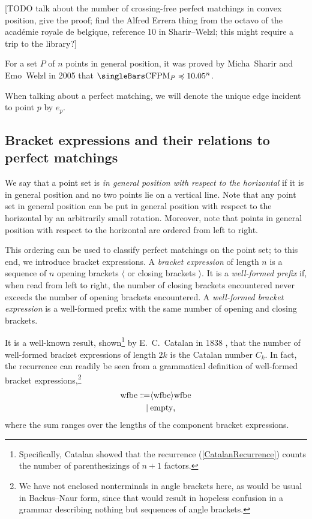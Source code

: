 \documentclass[10pt, a4paper, twoside]{basestyle}
\DeclareMathOperator{\CFPM}{CFPM}
\begin{document}
[TODO talk about the number of crossing-free perfect matchings in convex position, give the proof;
find the Alfred Errera thing from the octavo of the académie royale de belgique, reference 10 in
Sharir--Welzl; this might require a trip to the library?]

For a set $P$ of $n$ points in general position, it was proved by Micha~Sharir and Emo~Welzl in 2005
\cite{SharirWelzl2006} that $\Cardinality{\CFPM_P} \preccurlyeq 10.05^n$.

When talking about a perfect matching, we will denote the unique edge incident to point $p$ by
$e_p$.

\subsection{Bracket expressions and their relations to perfect matchings}

We say that a point set is \emph{in general position with respect to the horizontal} if it
is in general position and no two points lie on a vertical line. Note that any point set in
general position can be put in general position with respect to the horizontal by an arbitrarily
small rotation. Moreover, note that points in general position with respect to the horizontal
are ordered from left to right.

This ordering can be used to classify perfect matchings on the point set; to this end,
we introduce bracket expressions.
A \emph{bracket expression} of length $n$ is a sequence of $n$ opening brackets $\langle$ or closing
brackets $\rangle$.
It is a \emph{well-formed prefix} if, when read from left to right, the number of closing brackets
encountered never exceeds the number of opening brackets encountered.
A \emph{well-formed bracket expression} is a well-formed prefix with the same number of opening and
closing brackets.

It is a well-known result, shown\footnote{Specifically, Catalan showed that the recurrence (\ref{CatalanRecurrence})
counts the number of parenthesizings of $n+1$ factors.} by E.~C.~Catalan in 1838 \cite{Catalan1838}, that the
number of well-formed bracket expressions
of length $2k$ is the Catalan number $C_k$. In fact, the recurrence can readily be seen from
a grammatical definition of well-formed bracket expressions,\footnote{We have not enclosed nonterminals
in angle brackets here, as would be usual in Backus--Naur form, since that would result in hopeless
confusion in a grammar describing nothing but sequences of angle brackets.}\begin{align*}
\text{wfbe} \Coloneq
& \langle \text{wfbe} \rangle \text{wfbe} \\
\mid\: & \text{empty}\text,
\end{align*}
where the sum ranges over the lengths of the component bracket expressions.
\end{document}

